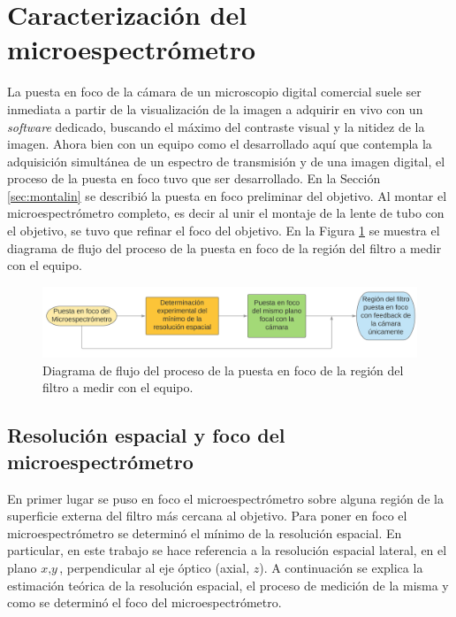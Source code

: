 \singlespacing
\section{Caracterización del microespectrómetro}
\label{sec:caractequipo}

\hspace{0.5cm}La puesta en foco de la cámara de un microscopio digital comercial suele ser inmediata a partir de la visualización de la imagen a adquirir en vivo con un \textit{software} dedicado, buscando el máximo del contraste visual y la nitidez de la imagen. Ahora bien con un equipo como el desarrollado aquí que contempla la adquisición simultánea de un espectro de transmisión y de una imagen digital, el proceso de la puesta en foco tuvo que ser desarrollado. En la Sección \ref{sec:montalin} se describió la puesta en foco preliminar del objetivo. Al montar el microespectrómetro completo, es decir al unir el montaje de la lente de tubo con el objetivo, se tuvo que refinar el foco del objetivo. En la Figura \ref{fig:diagpuestfoc} se muestra el diagrama de flujo del proceso de la puesta en foco de la región del filtro a medir con el equipo.

\begin{figure}[H]
	\centering
	\includegraphics[width=1.0\textwidth]{Figs/microespectrometro/diagramfoco.png}
	\caption{Diagrama de flujo del proceso de la puesta en foco de la región del filtro a medir con el equipo.}
	\label{fig:diagpuestfoc}
\end{figure}




\singlespacing
\subsection{Resolución espacial y foco del microespectrómetro}
\label{sec:focoresol}

\hspace{0.5cm}En primer lugar se puso en foco el microespectrómetro sobre alguna región de la superficie externa del filtro más cercana al objetivo. Para poner en foco el microespectrómetro se determinó el mínimo de la resolución espacial. En particular, en este trabajo se hace referencia a la resolución espacial lateral, en el plano $\textit{x},\textit{y}$, perpendicular al eje óptico (axial, $\textit{z}$). A continuación se explica la estimación teórica de la resolución espacial, el proceso de medición de la misma y como se determinó el foco del microespectrómetro.

